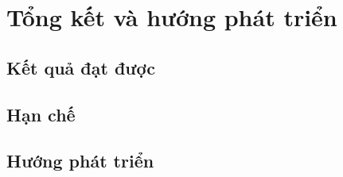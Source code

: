 \section{Tổng kết và hướng phát triển}
\subsection{Kết quả đạt được}
\subsection{Hạn chế}
\subsection{Hướng phát triển}
